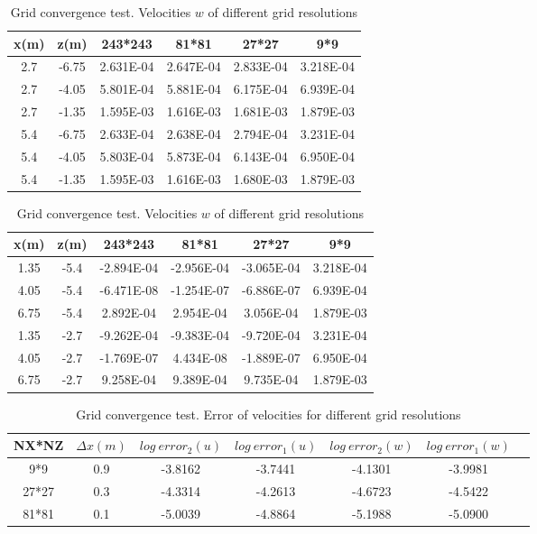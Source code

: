 \cp

\begin{table}[h]
\vspace{0.8in}
\caption{Grid convergence test. Velocities $u$ of different grid resolutions}
\begin{center}
\begin{tabular}{cccccc} \hline
x(m) & z(m) & 243*243 & 81*81 & 27*27 & 9*9  \\ \hline
2.7 & -6.75 &  2.631E-04  & 2.647E-04  & 2.833E-04  & 3.218E-04 \\
2.7 & -4.05 &  5.801E-04  & 5.881E-04  & 6.175E-04  & 6.939E-04 \\
2.7 & -1.35 &  1.595E-03  & 1.616E-03  & 1.681E-03  & 1.879E-03 \\
5.4 & -6.75 &  2.633E-04  & 2.638E-04  & 2.794E-04  & 3.231E-04 \\
5.4 & -4.05 &  5.803E-04  & 5.873E-04  & 6.143E-04  & 6.950E-04 \\
5.4 & -1.35 &  1.595E-03  & 1.616E-03  & 1.680E-03  & 1.879E-03 \\
\hline
\end{tabular}

\vspace{0.8in}
\caption{Grid convergence test. Velocities $w$ of different grid resolutions}
\begin{tabular}{cccccc} \hline
x(m) & z(m) & 243*243 & 81*81 & 27*27 & 9*9 \\ \hline
1.35  &  -5.4  &  -2.894E-04  & -2.956E-04  & -3.065E-04 & 3.218E-04 \\
4.05  &  -5.4  &  -6.471E-08  & -1.254E-07  & -6.886E-07 & 6.939E-04 \\
6.75  &  -5.4  &  2.892E-04   & 2.954E-04   & 3.056E-04  & 1.879E-03 \\
1.35  &  -2.7  &  -9.262E-04  & -9.383E-04  & -9.720E-04 & 3.231E-04 \\
4.05  &  -2.7  &  -1.769E-07  & 4.434E-08   & -1.889E-07 & 6.950E-04 \\
6.75  &  -2.7  &  9.258E-04   & 9.389E-04   & 9.735E-04  & 1.879E-03 \\
\hline
\end{tabular}
\end{center}
\end{table}

\cp

\begin{table}
\begin{center}
\vspace{0.5in}
\caption{Grid convergence test. Error of velocities for different grid resolutions}
\small
\begin{tabular}{ccccccc} \hline
NX*NZ & $\Delta x(m)$  & $log \ error_2(u)$ &  $log \ error_1(u)$ & $log \ error_2(w)$ & $log \ error_1(w)$ \\ \hline
9*9  & 0.9 & -3.8162  & -3.7441 & -4.1301 & -3.9981 \\
27*27& 0.3 & -4.3314  & -4.2613 & -4.6723 & -4.5422 \\
81*81& 0.1 & -5.0039  & -4.8864 & -5.1988 & -5.0900 \\
\hline
\end{tabular}
\end{center}
\end{table}

